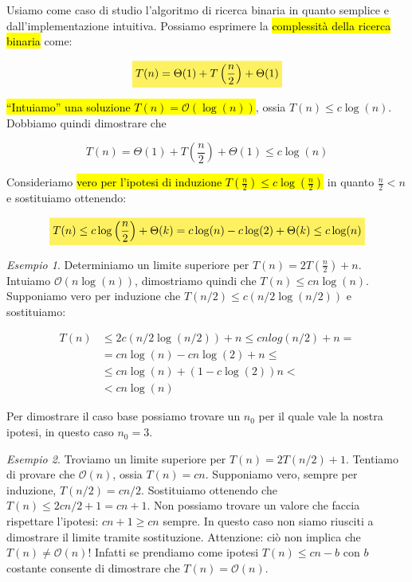 \documentclass[a4paper,11pt,oneside]{article}
\theoremstyle{plain}
\theoremstyle{definition}
\theoremstyle{remark}
\newtheorem{esempio}{Esempio}[section]
\newcommand{\mhl}[1]{\colorbox{hlcolor}{$\displaystyle #1$}}
\begin{document}
Usiamo come caso di studio l'algoritmo di ricerca binaria in quanto semplice e
dall'implementazione intuitiva. Possiamo esprimere la \hl{complessità della ricerca
binaria} come:

\begin{equation}
  \mhl{
    T(n) = \Theta(1) + T\left(\frac{n}{2}\right) + \Theta(1)
  }
\end{equation}

\hl{``Intuiamo'' una soluzione $T(n) = \mathcal{O}(\log(n))$}, ossia $T(n) \leq
c\log(n)$. Dobbiamo quindi dimostrare che

\begin{equation}
  T(n) = \Theta(1) + T\left(\frac{n}{2}\right) + \Theta(1) \leq c\log(n)
\end{equation}

Consideriamo \hl{vero per l'ipotesi di induzione $T(\frac{n}{2}) \leq
c\log(\frac{n}{2})$} in quanto $\frac{n}{2} < n$ e sostituiamo ottenendo:

\begin{equation}
  \mhl{
    T(n) \leq c\log\left(\frac{n}{2}\right) + \Theta(k) = c\log(n) - c\log(2) +
      \Theta(k) \leq c\log(n)
  }
\end{equation}

\begin{esempio}
  Determiniamo un limite superiore per $T(n) = 2T(\frac{n}{2})+n$. Intuiamo
  $\mathcal{O}(n\log(n))$, dimostriamo quindi che $T(n) \leq cn\log(n)$.
  Supponiamo vero per induzione che $T(n/2) \leq c(n/2\log(n/2))$ e sostituiamo:

  \begin{align*}
    T(n) & \leq 2c(n/2\log(n/2)) + n \leq cnlog(n/2)+n = \\
      & = cn\log(n) - cn\log(2) + n \leq \\
      & \leq cn\log(n) + (1-c\log(2))n < \\
      & < cn\log(n)
  \end{align*}

  Per dimostrare il caso base possiamo trovare un $n_0$ per il quale vale la
  nostra ipotesi, in questo caso $n_0 = 3$.
\end{esempio}
\begin{esempio}
  Troviamo un limite superiore per $T(n) = 2T(n/2) + 1$. Tentiamo di provare che
  $\mathcal{O}(n)$, ossia $T(n) = cn$. Supponiamo vero, sempre per induzione,
  $T(n/2) = cn/2$. Sostituiamo ottenendo che $T(n) \leq 2cn/2 + 1 = cn+1$. Non
  possiamo trovare un valore che faccia rispettare l'ipotesi: $cn+1 \geq cn$
  sempre. In questo caso non siamo riusciti a dimostrare il limite tramite
  sostituzione. Attenzione: ciò non implica che $T(n) \neq \mathcal{O}(n)$!
  Infatti se prendiamo come ipotesi $T(n) \leq cn-b$ con $b$ costante consente
  di dimostrare che $T(n) = \mathcal{O}(n)$.
\end{esempio}
\end{document}
